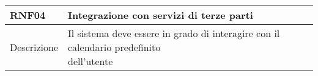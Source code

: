 \begin{table}[H]
  \begin{flushleft}
    \begin{tabular}{l|l}
      \toprule
      \textbf{RNF04} & \textbf{Integrazione con servizi di terze parti}\\
      \midrule
      Descrizione & \makecell{Il sistema deve essere in grado di interagire con il calendario predefinito \\ dell'utente}\\
      \bottomrule
    \end{tabular}
  \end{flushleft}
\end{table}
